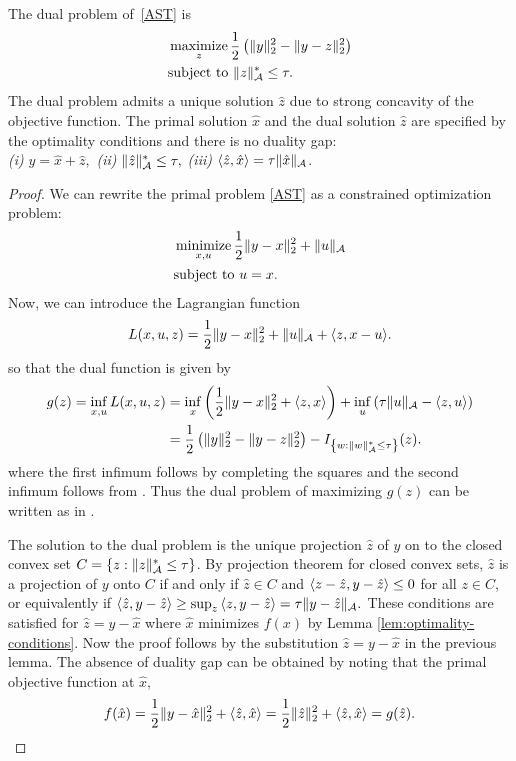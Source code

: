 \begin{lemma} \label{lem:dual-problem} The dual problem
of~\eqref{AST} is
\begin{equation*}
  \label{eq:dual-ast}
  \begin{split} &\mathop{\operatorname{maximize}}_z \frac{1}{2}\left(\lVert y\rVert_2^2 - \lVert y - z\rVert_2^2\right)\\ &\text{subject to } \lVert z\rVert_{\mathcal{A}}^* \leq \tau. \end{split} \end{equation*} 
The dual problem admits a unique solution $\hat{z}$ due to strong concavity of
the objective function. The primal solution $\hat{x}$ and the dual solution
$\hat{z}$ are specified by the optimality conditions and there is no duality
gap:\\
\emph{(i)} $y = \hat{x} + \hat{z},$ 
\emph{(ii)} $\lVert\hat{z}\rVert_{\mathcal{A}}^* \leq \tau,$
\emph{(iii)} $\langle\hat{z}, \hat{x}\rangle = \tau
\lVert\hat{x}\rVert_{\mathcal{A}}$.  \
\end{lemma}
\begin{proof}
We can rewrite the primal problem \eqref{AST} as a constrained optimization problem:
\[
\begin{split}
&\mathop{\operatorname{minimize}}_{x,u} \frac{1}{2}\lVert y - x\rVert_2^2 + \lVert u\rVert_{\mathcal{A}}\\
&\text{subject to }  u = x.
\end{split}
\]
Now, we can introduce the Lagrangian function
\begin{equation*}
L(x,u,z) = \frac{1}{2}\lVert y - x\rVert_2^2 + \lVert u\rVert_{\mathcal{A}} + \langle z, x - u\rangle.
\end{equation*} 
so that the dual function is given by
\begin{align*}
g(z) = \inf_{x,u} L(x,u,z)
& = \inf_{x}\left( \frac{1}{2}\lVert y - x\rVert_2^2 + \langle z, x\rangle \right) 
+ \inf_{u}\left( \tau\lVert u\rVert_{\mathcal{A}} - \langle z, u\rangle \right)\\
& = \frac{1}{2}\left(\lVert y\rVert_2^2 - \lVert y - z\rVert_2^2\right) - I_{\left\{ w : \lVert w\rVert_{\mathcal{A}}^* \leq \tau\right\}}(z).
\end{align*}
where the first infimum follows by completing the squares and the second infimum
follows from \eq{conjugate-norm}. Thus the dual problem of maximizing $g(z)$ can
be written as in \eq{dual-ast}.

The solution to the dual problem is the unique projection $\hat{z}$ of $y$ on to
the closed convex set $C = \{ z : \lVert z\rVert_{\mathcal{A}}^* \leq \tau \}$. By projection
theorem for closed convex sets, $\hat{z}$ is a projection of $y$ onto $C$ if and
only if $\hat{z} \in C$ and $\langle z - \hat{z}, y - \hat{z}\rangle \leq 0$ for all $z
\in C$, or equivalently if $\langle\hat{z}, y - \hat{z}\rangle \geq \sup_z\,\langle z, y
- \hat{z}\rangle = \tau \lVert y - \hat{z}\rVert_{\mathcal{A}}.$ These conditions are satisfied for
$\hat{z} = y - \hat{x}$ where $\hat{x}$ minimizes $f(x)$ by Lemma
\ref{lem:optimality-conditions}. Now the proof follows by the substitution
$\hat{z} = y - \hat{x}$ in the previous lemma. The absence of duality gap can be
obtained by noting that the primal objective function at $\hat{x},$
\[
f(\hat{x}) = \frac{1}{2}\lVert y - \hat{x}\rVert_2^2 + \langle\hat{z}, \hat{x}\rangle
= \frac{1}{2}\lVert\hat{z}\rVert_2^2 + \langle\hat{z}, \hat{x}\rangle = g(\hat{z}).
\]
\end{proof}


